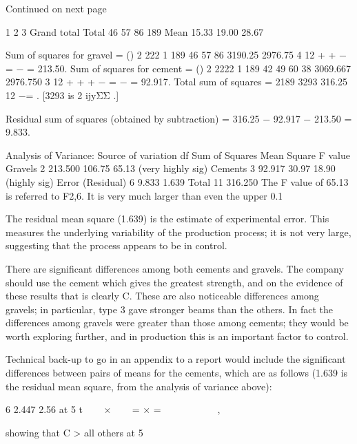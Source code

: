 Continued on next page 
 
 1 2 3 Grand total Total 46 57 86 189 Mean 15.33 19.00 28.67  

 
 
Sum of squares for gravel = () 2 222 1 189 46 57 86 3190.25 2976.75 4 12 + + − = −  = 213.50. Sum of squares for cement = () 2 2222 1 189 42 49 60 38 3069.667 2976.750 3 12 + + + − = − = 92.917. Total sum of squares = 2189 3293 316.25 12 −= .        [3293 is 2 ijyΣΣ .] 
 
Residual sum of squares (obtained by subtraction) = 316.25 − 92.917 − 213.50 = 9.833. 
 
Analysis of Variance: 
 Source of variation df Sum of Squares Mean Square F value Gravels   2 213.500 106.75 65.13  (very highly sig) Cements   3   92.917   30.97 18.90   (highly sig) Error (Residual)   6     9.833       1.639  Total 11 316.250   
 The F value of 65.13 is referred to F2,6.  It is very much larger than even the upper 0.1%
 
The residual mean square (1.639) is the estimate of experimental error.  This measures the underlying variability of the production process;  it is not very large, suggesting that the process appears to be in control. 
 
There are significant differences among both cements and gravels.  The company should use the cement which gives the greatest strength, and on the evidence of these results that is clearly C.  These are also noticeable differences among gravels;  in particular, type 3 gave stronger beams than the others.  In fact the differences among gravels were greater than those among cements;  they would be worth exploring further, and in production this is an important factor to control. 
 
 
Technical back-up to go in an appendix to a report would include the significant differences between pairs of means for the cements, which are as follows (1.639 is the residual mean square, from the analysis of variance above): 
 
6
2.447 2.56 at 5%
t
   ×    = × =         
  , 
 
showing that C > all others at 5%
